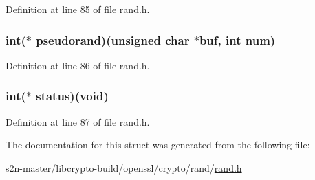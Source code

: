 Definition at line 85 of file rand.\+h.

\subsubsection[{\texorpdfstring{pseudorand}{pseudorand}}]{\setlength{\rightskip}{0pt plus 5cm}int($\ast$ pseudorand)(unsigned char $\ast$buf, int {\bf num})}\hypertarget{structrand__meth__st_aaa7c4023b248bead3632bc75102936ff}{}\label{structrand__meth__st_aaa7c4023b248bead3632bc75102936ff}


Definition at line 86 of file rand.\+h.

\subsubsection[{\texorpdfstring{status}{status}}]{\setlength{\rightskip}{0pt plus 5cm}int($\ast$ status)({\bf void})}\hypertarget{structrand__meth__st_a3c125700a2559e38ea6da1590009bea2}{}\label{structrand__meth__st_a3c125700a2559e38ea6da1590009bea2}


Definition at line 87 of file rand.\+h.



The documentation for this struct was generated from the following file\+:\begin{DoxyCompactItemize}
\item 
s2n-\/master/libcrypto-\/build/openssl/crypto/rand/\hyperlink{crypto_2rand_2rand_8h}{rand.\+h}\end{DoxyCompactItemize}
